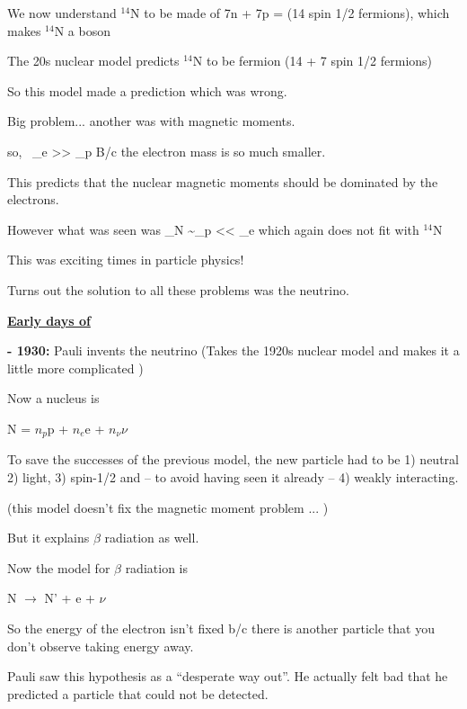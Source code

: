 {We now understand $^{14}$N to be made of 7n + 7p = (14 spin 1/2 fermions), which makes $^{14}$N a boson

The 20s nuclear model predicts $^{14}$N to be fermion (14 + 7 spin 1/2 fermions)

So this model made a prediction which was wrong. 

Big problem... another was with magnetic moments. 

\be
\mu \propto {}  \hspace{0.2in} \textrm{so,  }\ \mu_e >> \mu_p
\ee
B/c the electron mass is so much smaller. 

This predicts that the nuclear magnetic moments should be dominated by the electrons. 

However what was seen was 
\be
\mu_N \sim \mu_p << \mu_e \hspace{0.2in} \textrm{which again does not fit with $^{14}$N}
\ee

This was exciting times in particle physics! 

Turns out the solution to all these problems was the neutrino.

\textbf{\underline{Early days of \nus}}

\textbf{- 1930:} Pauli invents the neutrino (Takes the 1920s nuclear model and makes it a little more complicated )

Now a nucleus is

\begin{center}
N = $n_p$p + $n_e$e + $n_\nu \nu$
\end{center}

To save the successes of the previous model, the new particle had to be 1) neutral 2) light, 3) spin-1/2 and -- to avoid having seen it already -- 4) weakly interacting. 

(this model doesn't fix the magnetic moment problem ... )

But it explains $\beta$ radiation as well.

Now the model for $\beta$ radiation is

\begin{center}
N $\rightarrow$ N' + e + $\nu$
\end{center}

So the energy of the electron isn't fixed b/c there is another particle that you don't observe taking energy away.

Pauli saw this hypothesis as a ``desperate way out''.
He actually felt bad that he predicted a particle that could not be detected. 

}

